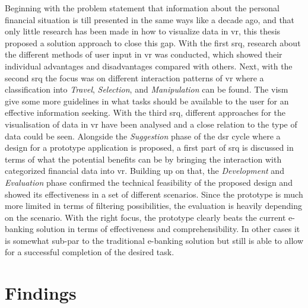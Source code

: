 Beginning with the problem statement that information about the personal financial situation is till presented in the same ways like a decade ago, and that only little research has been made in how to visualize data in \gls{vr}, this thesis proposed a solution approach to close this gap. With the first \gls{srq}, research about the different methods of user input in \gls{vr} was conducted, which showed their individual advantages and disadvantages compared with others. Next, with the second \gls{srq} the focus was on different interaction patterns of \gls{vr} where a classification into \textit{Travel}, \textit{Selection}, and \textit{Manipulation} can be found. The \gls{vism} give some more guidelines in what tasks should be available to the user for an effective information seeking. With the third \gls{srq}, different approaches for the visualisation of data in \gls{vr} have been analysed and a close relation to the type of data could be seen. Alongside the \textit{Suggestion} phase of the \gls{dsr} cycle where a design for a prototype application is proposed, a first part of \gls{srq} is discussed in terms of what the potential benefits can be by bringing the interaction with categorized financial data into \gls{vr}. Building up on that, the \textit{Development} and \textit{Evaluation} phase confirmed the technical feasibility of the proposed design and showed its effectiveness in a set of different scenarios. Since the prototype is much more limited in terms of filtering possibilities, the evaluation is heavily depending on the scenario. With the right focus, the prototype clearly beats the current e-banking solution in terms of effectiveness and comprehensibility. In other cases it is somewhat sub-par to the traditional e-banking solution but still is able to allow for a successful completion of the desired task.



\section{Findings}

